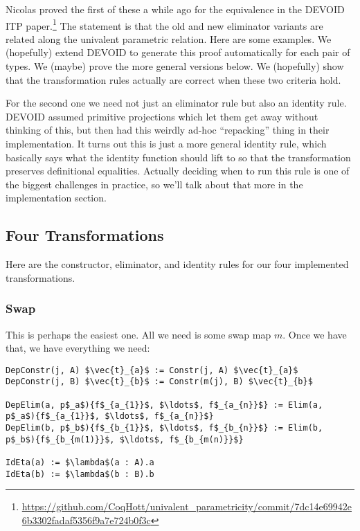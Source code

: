 Nicolas proved the first of these a while ago
for the equivalence in the DEVOID ITP paper.\footnote{\url{https://github.com/CoqHott/univalent_parametricity/commit/7dc14e69942e6b3302fadaf5356f9a7e724b0f3c}}
The statement is that the old and new eliminator variants are related along the univalent parametric relation.
Here are some examples.
We (hopefully) extend DEVOID to generate this proof automatically for each pair of types.
We (maybe) prove the more general versions below. 
We (hopefully) show that the transformation rules actually are correct when these two criteria hold.

For the second one we need not just an eliminator rule but also an identity rule.
DEVOID assumed primitive projections which let them get away without thinking of this,
but then had this weirdly ad-hoc ``repacking'' thing in their implementation.
It turns out this is just a more general identity rule, which basically says what
the identity function should lift to so that the transformation preserves definitional equalities.
Actually deciding when to run this rule is one of the biggest challenges in practice,
so we'll talk about that more in the implementation section.

\subsection{Four Transformations}

Here are the constructor, eliminator, and identity rules for our four implemented transformations.

\subsubsection{Swap}

This is perhaps the easiest one. All we need is some swap map $m$. Once we have that, we have everything we need:

\begin{lstlisting}
DepConstr(j, A) $\vec{t}_{a}$ := Constr(j, A) $\vec{t}_{a}$
DepConstr(j, B) $\vec{t}_{b}$ := Constr(m(j), B) $\vec{t}_{b}$

DepElim(a, p$_a$){f$_{a_{1}}$, $\ldots$, f$_{a_{n}}$} := Elim(a, p$_a$){f$_{a_{1}}$, $\ldots$, f$_{a_{n}}$}
DepElim(b, p$_b$){f$_{b_{1}}$, $\ldots$, f$_{b_{n}}$} := Elim(b, p$_b$){f$_{b_{m(1)}}$, $\ldots$, f$_{b_{m(n)}}$}

IdEta(a) := $\lambda$(a : A).a
IdEta(b) := $\lambda$(b : B).b
\end{lstlisting}

